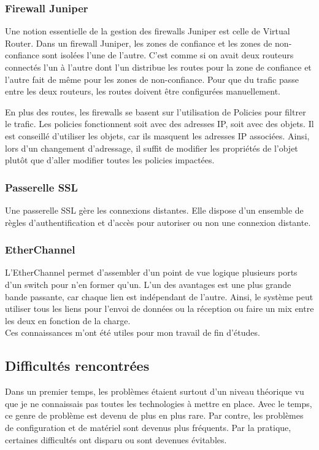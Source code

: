 \subsubsection{Firewall Juniper}
Une notion essentielle de la gestion des firewalls Juniper est celle de Virtual Router.
Dans un firewall Juniper, les zones de confiance et les zones de non-confiance sont isolées l'une de l'autre.
C'est comme si on avait deux routeurs connectés l'un à l'autre dont l'un distribue les routes pour la zone de confiance et l'autre fait de même pour les zones de non-confiance.
Pour que du trafic passe entre les deux routeurs, les routes doivent être configurées manuellement.

En plus des routes, les firewalls se basent sur l'utilisation de Policies pour filtrer le trafic.
Les policies fonctionnent soit avec des adresses IP, soit avec des objets. 
Il est conseillé d'utiliser les objets, car ils masquent les adresses IP associées. 
Ainsi, lors d'un changement d'adressage, il suffit de modifier les propriétés de l'objet plutôt que d'aller modifier toutes les policies impactées.
\subsubsection{Passerelle SSL}
Une passerelle SSL gère les connexions distantes.
Elle dispose d'un ensemble de règles d'authentification et d'accès pour autoriser ou non une connexion distante.

\subsubsection{EtherChannel}
L'EtherChannel permet d'assembler d'un point de vue logique plusieurs ports d'un switch pour n'en former qu'un.
L'un des avantages est une plus grande bande passante, car chaque lien est indépendant de l'autre.
Ainsi, le système peut utiliser tous les liens pour l'envoi de données ou la réception ou faire un mix entre les deux en fonction de la charge. \\

Ces connaissances m'ont été utiles pour mon travail de fin d'études. 

\subsection{Difficultés rencontrées}
Dans un premier temps, les problèmes étaient surtout d'un niveau théorique vu que je ne connaissais pas toutes les technologies à mettre en place. Avec le temps, ce genre de problème est devenu de plus en plus rare.
Par contre, les problèmes de configuration et de matériel sont devenus plus fréquents.
Par la pratique, certaines difficultés ont disparu ou sont devenues évitables. 

